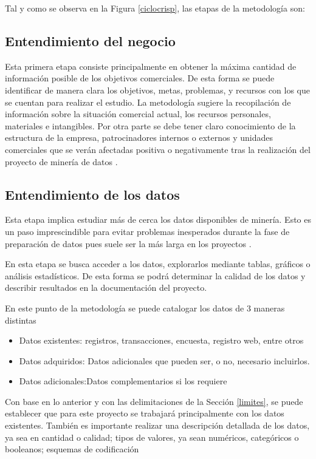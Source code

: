 Tal y como se observa en la Figura \ref{ciclocrisp}, las etapas de la metodología son:

\subsection{Entendimiento del negocio}
Esta primera etapa consiste principalmente en obtener la máxima cantidad de información posible de los objetivos comerciales. De esta forma se puede identificar de manera clara los objetivos, metas, problemas, y recursos con los que se cuentan para realizar el estudio. La metodología sugiere la recopilación de información sobre la situación comercial actual, los recursos personales, materiales e intangibles. Por otra parte se debe tener claro conocimiento de la estructura de la empresa, patrocinadores internos o externos y unidades comerciales que se verán afectadas positiva o negativamente tras la realización del proyecto de minería de datos \cite{ibmcrisp}.

\subsection{Entendimiento de los datos}
Esta etapa implica estudiar más de cerca los datos disponibles de minería. Esto es un paso imprescindible para evitar problemas inesperados durante la fase de preparación de datos pues suele ser la más larga en los proyectos \cite{ibmcrisp}.

En esta etapa se busca acceder a los datos, explorarlos mediante tablas, gráficos o análisis estadísticos. De esta forma se podrá determinar la calidad de los datos y describir resultados en la documentación del proyecto.

En este punto de la metodología se puede catalogar los datos de 3 maneras distintas
\begin{itemize}
    \item Datos existentes: registros, transacciones, encuesta, registro web, entre otros
    \item Datos adquiridos: Datos adicionales que pueden ser, o no, necesario incluirlos.
    \item Datos adicionales:Datos complementarios si los requiere
\end{itemize}
Con base en lo anterior y con las delimitaciones de la Sección \ref{limites}, se puede establecer que para este proyecto se trabajará principalmente con los datos existentes. También es importante realizar una descripción detallada de los datos, ya sea en cantidad o calidad; tipos de valores, ya sean numéricos, categóricos o booleanos; esquemas de codificación

